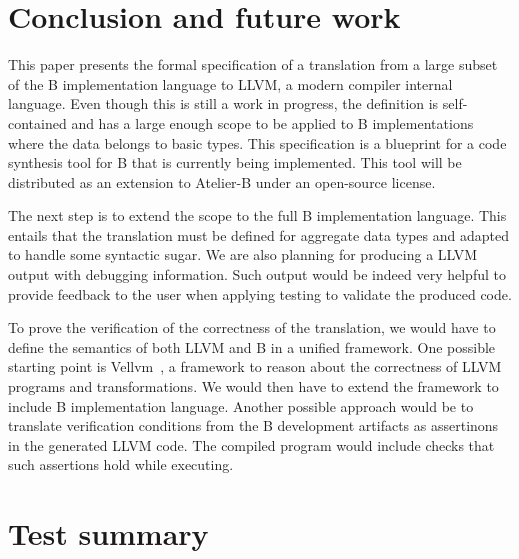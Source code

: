 \documentclass{llncs}
\begin{document}
\section{Conclusion and future work}
\label{sec:conclusion}

This paper presents the formal specification of a translation from a large
subset of the B implementation language to LLVM, a modern compiler internal
language.  Even though this is still a work in progress, the definition is
self-contained and has a large enough scope to be applied to B implementations
where the data belongs to basic types. This specification is a blueprint for a
code synthesis tool for B that is currently being implemented. This tool will be
distributed as an extension to Atelier-B under an open-source license.

The next step is to extend the scope to the full B implementation language. This
entails that the translation must be defined for aggregate data types and
adapted to handle some syntactic sugar. We are also planning for producing a
LLVM output with debugging information. Such output would be indeed very helpful
to provide feedback to the user when applying testing to validate the produced
code.

To prove the verification of the correctness of the translation, we would have
to define the semantics of both LLVM and B in a unified framework. One possible
starting point is Vellvm~\cite{vellvm}, a framework to reason about the
correctness of LLVM programs and transformations. We would then have to extend
the framework to include B implementation language. Another possible approach
would be to translate verification conditions from the B development artifacts
as assertinons in the generated LLVM code. The compiled program would include
checks that such assertions hold while executing.




\newpage
\appendix

\section{Test summary}
\end{document}
